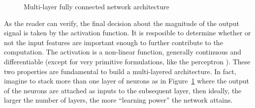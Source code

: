 \begin{figure}[t!]
  \centering
  \def\layersep{2.5cm}
  \caption{Multi-layer fully connected network architecture}
  \label{fig:mlfc}
\end{figure}
\noindent As the reader can verify, the final decision about the magnitude of the output signal is taken by the activation function. It is resposible to determine whether or not the input features are important enough to further contribute to the computation. The activation is a non-linear function, generally continuous and differentiable (except for very primitive formulations, like the perceptron \cite{rosenblatt1961principles}). These two properties are fundamental to build a multi-layered architecture. In fact, imagine to stack more than one layer of neurons as in Figure~\ref{fig:mlfc} where the output of the neurons are attached as inputs to the subsequent layer, then ideally, the larger the number of layers, the more ``learning power'' the network attains.
